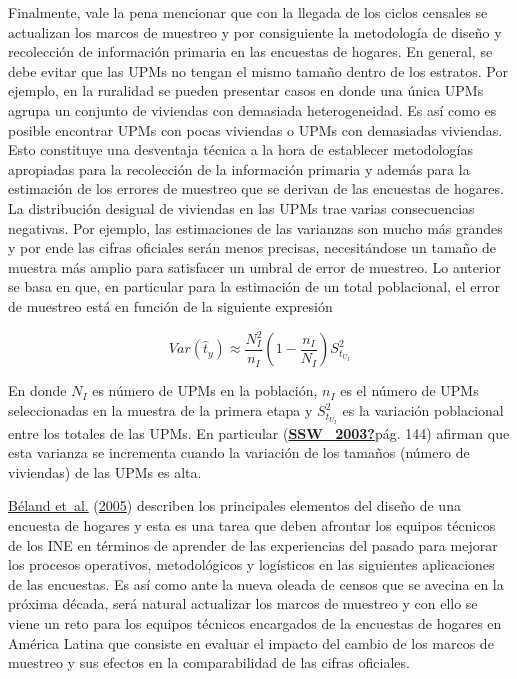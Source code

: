 \documentclass[
  12pt,
  spanish,
]{book}
\begin{document}
Finalmente, vale la pena mencionar que con la llegada de los ciclos censales se actualizan los marcos de muestreo y por consiguiente la metodología de diseño y recolección de información primaria en las encuestas de hogares. En general, se debe evitar que las UPMs no tengan el mismo tamaño dentro de los estratos. Por ejemplo, en la ruralidad se pueden presentar casos en donde una única UPMs agrupa un conjunto de viviendas con demasiada heterogeneidad. Es así como es posible encontrar UPMs con pocas viviendas o UPMs con demasiadas viviendas. Esto constituye una desventaja técnica a la hora de establecer metodologías apropiadas para la recolección de la información primaria y además para la estimación de los errores de muestreo que se derivan de las encuestas de hogares. La distribución desigual de viviendas en las UPMs trae varias consecuencias negativas. Por ejemplo, las estimaciones de las varianzas son mucho más grandes y por ende las cifras oficiales serán menos precisas, necesitándose un tamaño de muestra más amplio para satisfacer un umbral de error de muestreo. Lo anterior se basa en que, en particular para la estimación de un total poblacional, el error de muestreo está en función de la siguiente expresión

\[Var(\hat{t}_y) \approx \frac{N_I^2}{n_I}\left(1-\frac{n_I}{N_I}\right)S^2_{t_{U_I}} \]

En donde \(N_I\) es número de UPMs en la población, \(n_I\) es el número de UPMs seleccionadas en la muestra de la primera etapa y \(S^2_{t_{U_I}}\) es la variación poblacional entre los totales de las UPMs. En particular (\protect\hyperlink{ref-SSW_2003}{\textbf{SSW\_2003?}}pág. 144) afirman que esta varianza se incrementa cuando la variación de los tamaños (número de viviendas) de las UPMs es alta.

\protect\hyperlink{ref-Beland_Dale_Dufour_Hamel_2005}{Béland et~al.} (\protect\hyperlink{ref-Beland_Dale_Dufour_Hamel_2005}{2005}) describen los principales elementos del diseño de una encuesta de hogares y esta es una tarea que deben afrontar los equipos técnicos de los INE en términos de aprender de las experiencias del pasado para mejorar los procesos operativos, metodológicos y logísticos en las siguientes aplicaciones de las encuestas. Es así como ante la nueva oleada de censos que se avecina en la próxima década, será natural actualizar los marcos de muestreo y con ello se viene un reto para los equipos técnicos encargados de la encuestas de hogares en América Latina que consiste en evaluar el impacto del cambio de los marcos de muestreo y sus efectos en la comparabilidad de las cifras oficiales.
\end{document}
